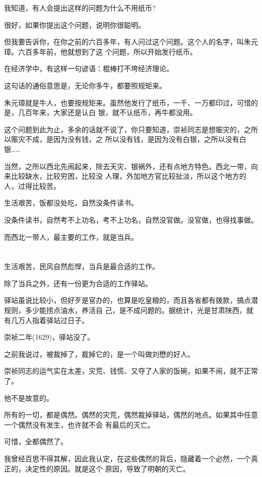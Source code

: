 \documentclass[11pt,a4paper,onecolumn]{article}
\begin{document}
我知道，有人会提出这样的问题\myrule 为什么不用纸币?

很好，如果你提出这个问题，说明你很聪明。

但我要告诉你，在你之前的六百多年，有人问过这个问题。这个人的名字，叫朱元璋。六百多年前，他就想到了这
个问题，所以开始发行纸币。

在经济学中，有这样一句谚语：棍棒打不垮经济理论。

这句话的通俗意思是，无论你多牛，都要照规矩来。

朱元璋就是牛人，也要按规矩来。虽然他发行了纸币，一千、一万都印过，可惜的是，几百年来，大家还是认白
银，就不认纸币，再牛都没用。

这个问题到此为止，多余的话就不说了，你只要知道，崇祯同志是想赈灾的，之所以赈灾不成，是因为没有钱，之
所以没有钱，是因为没有白银，之所以没有白银……

当然，之所以西北先闹起来，除去天灾、银祸外，还有点地方特色。西北一带，向来比较缺水，比较穷困，比较没
人理，外加地方官比较扯淡，所以这个地方的人，过得比较苦。

生活艰苦，饭都没处吃，自然没条件读书。

没条件读书，自然考不上功名，考不上功名，自然没官做。没官做，也得找事做。

而西北一带人，最主要的工作，就是当兵。

\section[\thesection]{}

生活艰苦，民风自然彪悍，当兵是最合适的工作。

除了当兵之外，还有一份更为合适的工作\myrule 驿站。

驿站虽说比较小，但好歹是官办的，也算是吃皇粮的，而且各省都有拨款，搞点潜规则，多少能捞点油水，养活自
己，是不成问题的。据统计，光是甘肃陕西，就有几万人指着驿站过日子。

崇祯二年(1629)，驿站没了。

之前我说过，被裁掉了，裁掉它的，是一个叫做刘懋的好人。

崇祯同志的运气实在太差，灾荒、钱慌、又夺了人家的饭碗，如果不闹，就不正常了。

他不是故意的。

所有的一切，都是偶然。偶然的灾荒，偶然裁掉驿站，偶然的地点。如果其中任意一个偶然没有发生，也许就不会
有最后的灭亡。

可惜，全都偶然了。

我曾经百思不得其解，因此我认定，在这些偶然的背后，隐藏着一个必然，一个真正的，决定性的原因。就是这个
原因，导致了明朝的灭亡。
\end{document}
